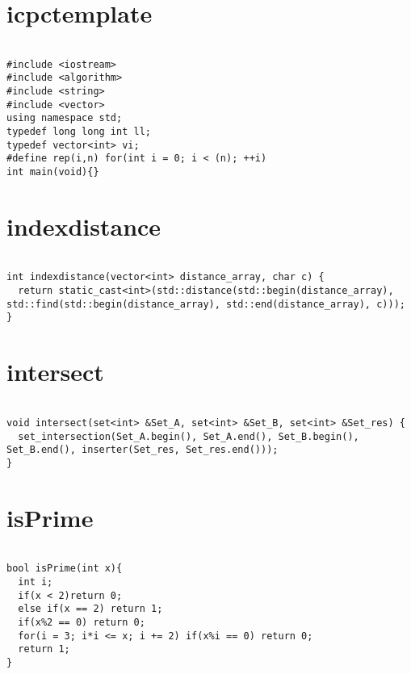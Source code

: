 \documentclass[a4j,titlepage]{jarticle} %
\begin{document}
\color{white}
\section{icpctemplate}
\color{black}
\begin{lstlisting}[caption=icpctemplate]

#include <iostream>
#include <algorithm>
#include <string>
#include <vector>
using namespace std;
typedef long long int ll;
typedef vector<int> vi;
#define rep(i,n) for(int i = 0; i < (n); ++i)
int main(void){}

\end{lstlisting}

\color{white}
\section{indexdistance}
\color{black}
\begin{lstlisting}[caption=indexdistance]

int indexdistance(vector<int> distance_array, char c) {
  return static_cast<int>(std::distance(std::begin(distance_array), std::find(std::begin(distance_array), std::end(distance_array), c)));
}

\end{lstlisting}

\color{white}
\section{intersect}
\color{black}
\begin{lstlisting}[caption=intersect]

void intersect(set<int> &Set_A, set<int> &Set_B, set<int> &Set_res) {
  set_intersection(Set_A.begin(), Set_A.end(), Set_B.begin(), Set_B.end(), inserter(Set_res, Set_res.end()));
}

\end{lstlisting}

\color{white}
\section{isPrime}
\color{black}
\begin{lstlisting}[caption=isPrime]

bool isPrime(int x){
  int i;
  if(x < 2)return 0;
  else if(x == 2) return 1;
  if(x%2 == 0) return 0;
  for(i = 3; i*i <= x; i += 2) if(x%i == 0) return 0;
  return 1;
}

\end{lstlisting}
\end{document}
